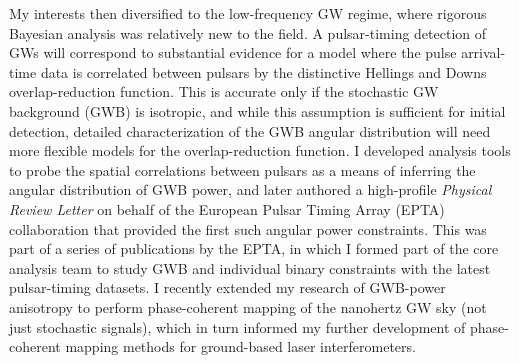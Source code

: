 \documentclass[11pt,letterpaper,sans]{moderncv} %
\begin{document}
My interests then diversified to the low-frequency GW regime, where rigorous Bayesian analysis was relatively new to the field. A pulsar-timing detection of GWs will correspond to substantial evidence for a model where the pulse arrival-time data is correlated between pulsars by the distinctive Hellings and Downs overlap-reduction function. This is accurate only if the stochastic GW background (GWB) is isotropic, and while this assumption is sufficient for initial detection, detailed characterization of the GWB angular distribution will need more flexible models for the overlap-reduction function. I developed analysis tools to probe the spatial correlations between pulsars as a means of inferring the angular distribution of GWB power, and later authored a high-profile \textit{Physical Review Letter} on behalf of the European Pulsar Timing Array (EPTA) collaboration that provided the first such angular power constraints. This was part of a series of publications by the EPTA, in which I formed part of the core analysis team to study GWB and individual binary constraints with the latest pulsar-timing datasets. I recently extended my research of GWB-power anisotropy to perform phase-coherent mapping of the nanohertz GW sky (not just stochastic signals), which in turn informed my further development of phase-coherent mapping methods for ground-based laser interferometers.
\vspace{1mm}
\end{document}
